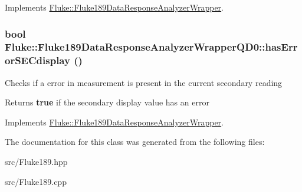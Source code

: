 Implements \hyperlink{classFluke_1_1Fluke189DataResponseAnalyzerWrapper_a25ca42185c5573fb30a6c60e72c36e27}{Fluke::Fluke189DataResponseAnalyzerWrapper}.\hypertarget{classFluke_1_1Fluke189DataResponseAnalyzerWrapperQD0_aad8855dc897cc83a4a7b4df79657a724}{
\subsubsection[{hasErrorSECdisplay}]{\setlength{\rightskip}{0pt plus 5cm}bool Fluke::Fluke189DataResponseAnalyzerWrapperQD0::hasErrorSECdisplay ()}}
\label{classFluke_1_1Fluke189DataResponseAnalyzerWrapperQD0_aad8855dc897cc83a4a7b4df79657a724}
Checks if a error in measurement is present in the current secondary reading \begin{DoxyReturn}{Returns}
{\bfseries true} if the secondary display value has an error 
\end{DoxyReturn}


Implements \hyperlink{classFluke_1_1Fluke189DataResponseAnalyzerWrapper_a99952a4552f0cb6705996b28312850dc}{Fluke::Fluke189DataResponseAnalyzerWrapper}.

The documentation for this class was generated from the following files:\begin{DoxyCompactItemize}
\item 
src/Fluke189.hpp\item 
src/Fluke189.cpp\end{DoxyCompactItemize}
